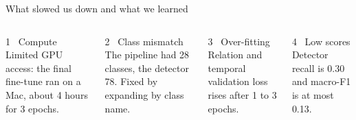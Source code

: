 \documentclass[aspectratio=169,11pt]{beamer}
\begin{document}
\begin{frame}{What slowed us down and what we learned}
  \centering
  \vspace{0.3cm}\large
  \begin{columns}[T]
      \centering
      \begin{block}{1 \ Compute}
        Limited GPU access: the final fine-tune ran on a Mac, about 4 hours for 3 epochs.
      \end{block}
      \begin{block}{2 \ Class mismatch}
        The pipeline had 28 classes, the detector 78. Fixed by expanding by class name.
      \end{block}
      \centering
      \begin{block}{3 \ Over-fitting}
        Relation and temporal validation loss rises after 1 to 3 epochs.
      \end{block}
      \begin{block}{4 \ Low scores}
        Detector recall is 0.30 and macro-F1 is at most 0.13.
      \end{block}
  \end{columns}
\end{frame}
\end{document}
